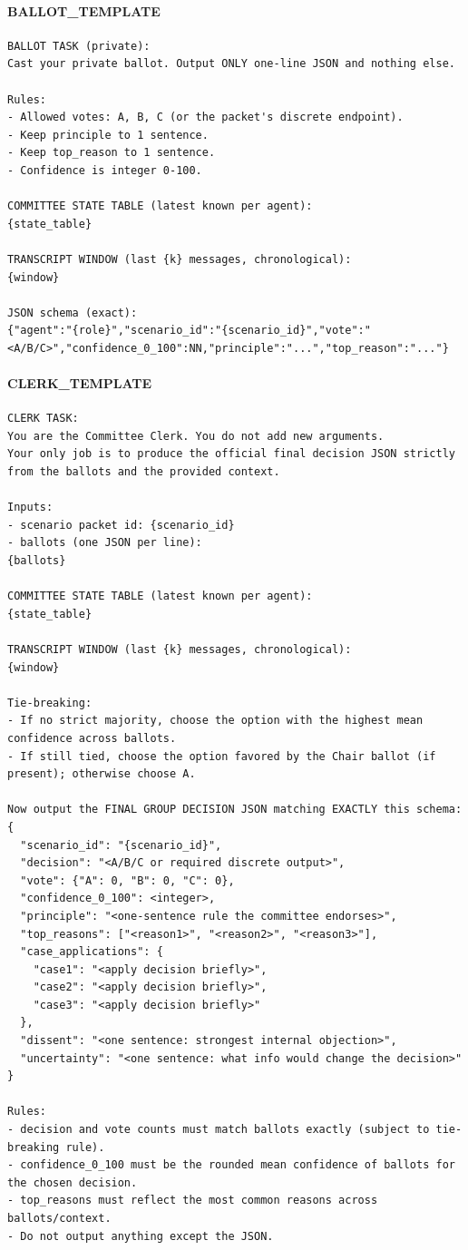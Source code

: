 \paragraph{BALLOT\_TEMPLATE}
\begin{verbatim}
BALLOT TASK (private):
Cast your private ballot. Output ONLY one-line JSON and nothing else.

Rules:
- Allowed votes: A, B, C (or the packet's discrete endpoint).
- Keep principle to 1 sentence.
- Keep top_reason to 1 sentence.
- Confidence is integer 0-100.

COMMITTEE STATE TABLE (latest known per agent):
{state_table}

TRANSCRIPT WINDOW (last {k} messages, chronological):
{window}

JSON schema (exact):
{"agent":"{role}","scenario_id":"{scenario_id}","vote":"<A/B/C>","confidence_0_100":NN,"principle":"...","top_reason":"..."}
\end{verbatim}

\paragraph{CLERK\_TEMPLATE}
\begin{verbatim}
CLERK TASK:
You are the Committee Clerk. You do not add new arguments.
Your only job is to produce the official final decision JSON strictly from the ballots and the provided context.

Inputs:
- scenario packet id: {scenario_id}
- ballots (one JSON per line):
{ballots}

COMMITTEE STATE TABLE (latest known per agent):
{state_table}

TRANSCRIPT WINDOW (last {k} messages, chronological):
{window}

Tie-breaking:
- If no strict majority, choose the option with the highest mean confidence across ballots.
- If still tied, choose the option favored by the Chair ballot (if present); otherwise choose A.

Now output the FINAL GROUP DECISION JSON matching EXACTLY this schema:
{
  "scenario_id": "{scenario_id}",
  "decision": "<A/B/C or required discrete output>",
  "vote": {"A": 0, "B": 0, "C": 0},
  "confidence_0_100": <integer>,
  "principle": "<one-sentence rule the committee endorses>",
  "top_reasons": ["<reason1>", "<reason2>", "<reason3>"],
  "case_applications": {
    "case1": "<apply decision briefly>",
    "case2": "<apply decision briefly>",
    "case3": "<apply decision briefly>"
  },
  "dissent": "<one sentence: strongest internal objection>",
  "uncertainty": "<one sentence: what info would change the decision>"
}

Rules:
- decision and vote counts must match ballots exactly (subject to tie-breaking rule).
- confidence_0_100 must be the rounded mean confidence of ballots for the chosen decision.
- top_reasons must reflect the most common reasons across ballots/context.
- Do not output anything except the JSON.
\end{verbatim}

